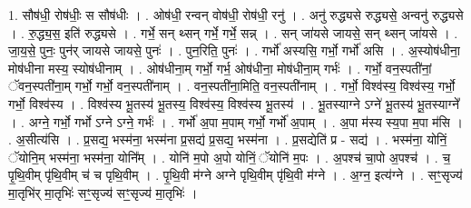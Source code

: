 \documentclass[17pt]{extarticle}
\begin{document}
1. सौष॑धी॒ रोष॑धीः॒ स सौष॑धीः । . ओष॑धी॒ रन्वन् वोष॑धी॒ रोष॑धी॒ रनु॑ । . अनु॑ रुद्ध्यसे रुद्ध्यसे॒ अन्वनु॑ रुद्ध्यसे । . रु॒द्ध्य॒स॒ इति॑ रुद्ध्यसे । . गर्भे॒ सन् थ्सन् गर्भे॒ गर्भे॒ सन्न् । . सन् जा॑यसे जायसे॒ सन् थ्सन् जा॑यसे । . जा॒य॒से॒ पुनः॒ पुन॑र् जायसे जायसे॒ पुनः॑ । . पुन॒रिति॒ पुनः॑ । . गर्भो॑ अस्यसि॒ गर्भो॒ गर्भो॑ असि । . अ॒स्योष॑धीना॒ मोष॑धीना मस्य॒ स्योष॑धीनाम् । . ओष॑धीना॒म् गर्भो॒ गर्भ॒ ओष॑धीना॒ मोष॑धीना॒म् गर्भः॑ । . गर्भो॒ वन॒स्पती॑नां॒ ॅवन॒स्पती॑ना॒म् गर्भो॒ गर्भो॒ वन॒स्पती॑नाम् । . वन॒स्पती॑ना॒मिति॒ वन॒स्पती॑नाम् । . गर्भो॒ विश्व॑स्य॒ विश्व॑स्य॒ गर्भो॒ गर्भो॒ विश्व॑स्य । . विश्व॑स्य भू॒तस्य॑ भू॒तस्य॒ विश्व॑स्य॒ विश्व॑स्य भू॒तस्य॑ । . भू॒तस्याग्ने ऽग्ने॑ भू॒तस्य॑ भू॒तस्याग्ने᳚ । . अग्ने॒ गर्भो॒ गर्भो ऽग्ने ऽग्ने॒ गर्भः॑ । . गर्भो॑ अ॒पा म॒पाम् गर्भो॒ गर्भो॑ अ॒पाम् । . अ॒पा म॑स्य स्य॒पा म॒पा म॑सि । . अ॒सीत्य॑सि । . प्र॒सद्य॒ भस्म॑ना॒ भस्म॑ना प्र॒सद्य॑ प्र॒सद्य॒ भस्म॑ना । . प्र॒सद्येति॑ प्र - सद्य॑ । . भस्म॑ना॒ योनिं॒ ॅयोनि॒म् भस्म॑ना॒ भस्म॑ना॒ योनि᳚म् । . योनि॑ म॒पो अ॒पो योनिं॒ ॅयोनि॑ म॒पः । . अ॒पश्च॑ चा॒पो अ॒पश्च॑ । . च॒ पृ॒थि॒वीम् पृ॑थि॒वीम् च॑ च पृथि॒वीम् । . पृ॒थि॒वी म॑ग्ने अग्ने पृथि॒वीम् पृ॑थि॒वी म॑ग्ने । . अ॒ग्न॒ इत्य॑ग्ने । . सꣳ॒॒सृज्य॑ मा॒तृभि॑र् मा॒तृभिः॑ सꣳ॒॒सृज्य॑ सꣳ॒॒सृज्य॑ मा॒तृभिः॑ । \newline
\end{document}
